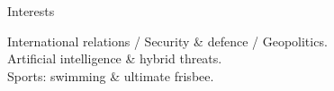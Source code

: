 \documentclass{resume}
\begin{document}

\begin{rSection}{Interests}

International relations / Security \& defence / Geopolitics.
\\
Artificial intelligence \& hybrid threats.
\\
Sports: swimming \& ultimate frisbee.

\end{rSection}
\end{document}
